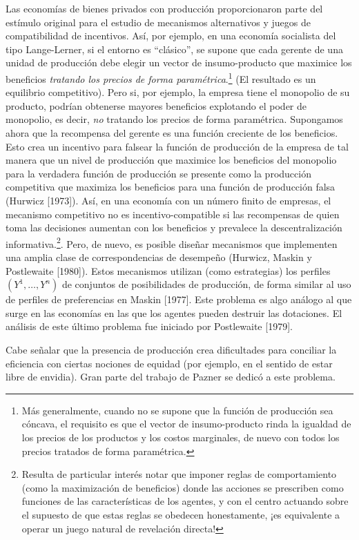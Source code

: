 \documentclass[12pt, letterpaper]{article}
\begin{document}
Las economías de bienes privados con producción proporcionaron parte del estímulo original para el estudio de mecanismos alternativos y juegos de compatibilidad de incentivos. Así, por ejemplo, en una economía socialista del tipo Lange-Lerner, si el entorno es ``clásico'', se supone que cada gerente de una unidad de producción debe elegir un vector de insumo-producto que maximice los beneficios \textit{tratando los precios de forma paramétrica}.\footnote{Más generalmente, cuando no se supone que la función de producción sea cóncava, el requisito es que el vector de insumo-producto rinda la igualdad de los precios de los productos y los costos marginales, de nuevo con todos los precios tratados de forma paramétrica.} (El resultado es un equilibrio competitivo). Pero si, por ejemplo, la empresa tiene el monopolio de su producto, podrían obtenerse mayores beneficios explotando el poder de monopolio, es decir, \textit{no} tratando los precios de forma paramétrica. Supongamos ahora que la recompensa del gerente es una función creciente de los beneficios. Esto crea un incentivo para falsear la función de producción de la empresa de tal manera que un nivel de producción que maximice los beneficios del monopolio para la verdadera función de producción se presente como la producción competitiva que maximiza los beneficios para una función de producción falsa (Hurwicz [1973]). Así, en una economía con un número finito de empresas, el mecanismo competitivo no es incentivo-compatible si las recompensas de quien toma las decisiones aumentan con los beneficios y prevalece la descentralización informativa.\footnote{Resulta de particular interés notar que imponer reglas de comportamiento (como la maximización de beneficios) donde las acciones se prescriben como funciones de las características de los agentes, y con el centro actuando sobre el supuesto de que estas reglas se obedecen honestamente, ¡es equivalente a operar un juego natural de revelación directa!}. Pero, de nuevo, es posible diseñar mecanismos que implementen una amplia clase de correspondencias de desempeño (Hurwicz, Maskin y Postlewaite [1980]). Estos mecanismos utilizan (como estrategias) los perfiles $(Y^1, \dots, Y^n)$ de conjuntos de posibilidades de producción, de forma similar al uso de perfiles de preferencias en Maskin [1977]. Este problema es algo análogo al que surge en las economías en las que los agentes pueden destruir las dotaciones. El análisis de este último problema fue iniciado por Postlewaite [1979].

Cabe señalar que la presencia de producción crea dificultades para conciliar la eficiencia con ciertas nociones de equidad (por ejemplo, en el sentido de estar libre de envidia). Gran parte del trabajo de Pazner se dedicó a este problema.
\end{document}
